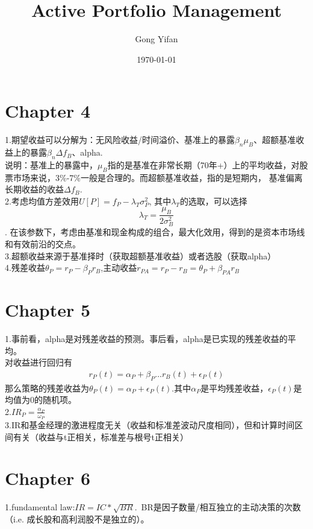 \documentclass{article}
\title{Active Portfolio Management}
\author{Gong Yifan}
\date{\today}
\begin{document}
\maketitle
\tableofcontents

\section{Chapter 4}
1.期望收益可以分解为：无风险收益/时间溢价、基准上的暴露$\beta_n\mu_B$、超额基准收益上的暴露$\beta_n\Delta{f_B}$、alpha.\\
说明：基准上的暴露中，$\mu_B$指的是基准在非常长期（70年+）上的平均收益，对股票市场来说，3\%-7\%一般是合理的。而超额基准收益，指的是短期内，
基准偏离长期收益的收益$\Delta{f_B}.$\\
2.考虑均值方差效用$U[P] = f_P - \lambda_T\sigma^2_P$, 其中$\lambda_T$的选取，可以选择$$\lambda_T = \frac{\mu_B}{2\sigma^2_B}$$. 
在该参数下，考虑由基准和现金构成的组合，最大化效用，得到的是资本市场线和有效前沿的交点。\\
3.超额收益来源于基准择时（获取超额基准收益）或者选股（获取alpha）\\
4.残差收益$\theta_P = r_P - \beta_P r_B$,主动收益$r_{PA} = r_P - r_B = \theta_P + \beta_{PA} r_B$

\section{Chapter 5}
1.事前看，alpha是对残差收益的预测。事后看，alpha是已实现的残差收益的平均。\\
对收益进行回归有\begin{align}
    r_P(t) = \alpha_P+\beta_P\dots r_B(t) + \epsilon_P(t)
\end{align}
那么策略的残差收益为$\theta_P(t) = \alpha_P+\epsilon_P(t).$其中$\alpha_P$是平均残差收益，$\epsilon_P(t)$是均值为0的随机项。\\
2.$IR_P = \frac{\alpha_P}{\omega_P}$\\
3.IR和基金经理的激进程度无关（收益和标准差波动尺度相同），但和计算时间区间有关（收益与t正相关，标准差与根号t正相关）

\section{Chapter 6}
1.fundamental law:$IR = IC*\sqrt{BR}.$~BR是因子数量/相互独立的主动决策的次数（i.e. 成长股和高利润股不是独立的）。
\end{document}

